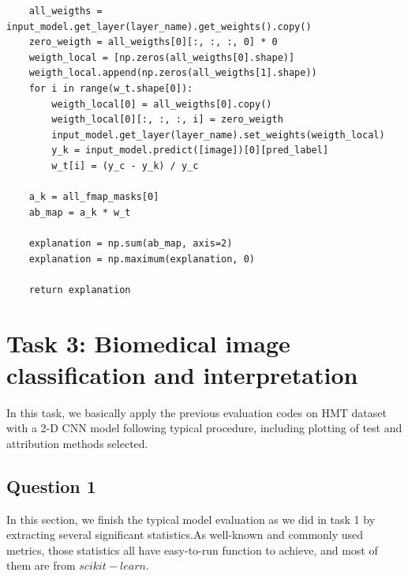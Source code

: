 \documentclass[conference]{IEEEtran}
\begin{document}
\begin{lstlisting}
    all_weigths = input_model.get_layer(layer_name).get_weights().copy()
    zero_weigth = all_weigths[0][:, :, :, 0] * 0
    weigth_local = [np.zeros(all_weigths[0].shape)]
    weigth_local.append(np.zeros(all_weigths[1].shape))
    for i in range(w_t.shape[0]):
        weigth_local[0] = all_weigths[0].copy()
        weigth_local[0][:, :, :, i] = zero_weigth
        input_model.get_layer(layer_name).set_weights(weigth_local)
        y_k = input_model.predict([image])[0][pred_label]
        w_t[i] = (y_c - y_k) / y_c

    a_k = all_fmap_masks[0]
    ab_map = a_k * w_t

    explanation = np.sum(ab_map, axis=2)
    explanation = np.maximum(explanation, 0)

    return explanation
\end{lstlisting}

\section{Task 3: Biomedical image classification and interpretation}
In this task, we basically apply the previous evaluation codes on HMT dataset with a 2-D CNN model following typical procedure, including plotting of test and attribution methods selected.
\subsection{Question 1}
In this section, we finish the typical model evaluation as we did in task 1 by extracting several significant statistics.As well-known and commonly used metrics, those statistics all have easy-to-run
function to achieve, and most of them are from $scikit-learn$.
\end{document}
